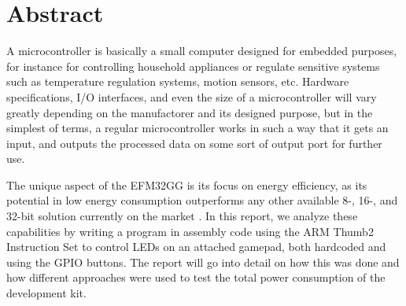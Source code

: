 \section{Abstract}

A microcontroller is basically a small computer designed for embedded purposes, for instance for controlling household appliances or regulate sensitive systems such as temperature regulation systems, motion sensors, etc. Hardware specifications, I/O interfaces, and even the size of a microcontroller will vary greatly depending on the manufactorer and its designed purpose, but in the simplest of terms, a regular microcontroller works in such a way that it gets an input, and outputs the processed data on some sort of output port for further use.
	
The unique aspect of the EFM32GG is its focus on energy efficiency, as its potential in low energy consumption outperforms any other available 8-, 16-, and 32-bit solution currently on the market \cite{EFM32GG-rm}. In this report, we analyze these capabilities by writing a program in assembly code using the ARM Thumb2 Instruction Set to control LEDs on an attached gamepad, both hardcoded and using the GPIO buttons. The report will go into detail on how this was done and how different approaches were used to test the total power consumption of the development kit.
	
	